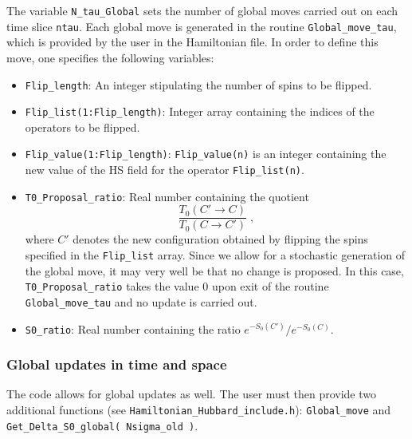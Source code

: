 The variable \texttt{N\_tau\_Global}  sets the number of global moves carried out on each time slice \texttt{ntau}. Each global move is generated in the routine  \texttt{Global\_move\_tau}, which is provided by the user in the Hamiltonian file. In order to  define this move, one specifies the following variables: 
\begin{itemize}
\item \texttt{Flip\_length}:  An integer stipulating the  number of spins to be flipped.
\item \texttt{Flip\_list(1:Flip\_length)}:   Integer array containing the  indices of the operators to be flipped.
\item \texttt{Flip\_value(1:Flip\_length)}:  \texttt{Flip\_value(n)} is an  integer containing the new value of the  HS  field for the operator \texttt{Flip\_list(n)}.
\item  \texttt{T0\_Proposal\_ratio}:   Real number containing  the quotient
\begin{equation}
	 \frac{T_0(C' \rightarrow C)}{T_0(C \rightarrow C') }  \;, \label{T0_ratio}
\end{equation}
where $ C'$  denotes the new configuration  obtained by flipping the spins specified in the \texttt{Flip\_list}  array. 
Since we allow for a stochastic  generation of  the global move, it may very well be that no change is proposed. In this case, \texttt{T0\_Proposal\_ratio}   takes the value 0 upon exit of the routine \texttt{Global\_move\_tau} and  no update is carried out. 
\item \texttt{S0\_ratio}:   Real number containing  the ratio  $e^{-S_0(C')}/e^{-S_0(C)}$. 
\end{itemize}
\subsubsection{Global updates in time and space}
\label{sec:global_slice}
%  
The code allows for global updates as well. The user must then provide two additional functions (see \texttt{Hamiltonian\_Hubbard\_include.h}): \texttt{Global\_move} and \texttt{Get\_\-Delta\_\-S0\_\-global( Nsigma\_old )}.   

